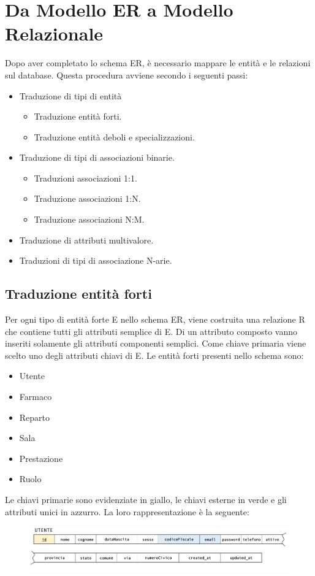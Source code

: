 \documentclass[paper=a4, fontsize=11pt,x11names]{report}
\begin{document}
\chapter{Da Modello ER a Modello Relazionale}
Dopo aver completato lo schema ER, è necessario mappare le entità e le relazioni sul database. Questa procedura avviene secondo i seguenti passi:

\begin{itemize}
\item Traduzione di tipi di entità
\begin{itemize}
\item Traduzione entità forti.
\item Traduzione entità deboli e specializzazioni.
\end{itemize}
\item Traduzione di tipi di associazioni binarie.
\begin{itemize}
\item Traduzioni associazioni 1:1.
\item Traduzione associazioni 1:N.
\item Traduzione associazioni N:M.
\end{itemize} 
\item Traduzione di attributi multivalore.
\item Traduzioni di tipi di associazione N-arie.
\end{itemize}

\section{Traduzione entità forti}
Per ogni tipo di entità forte E nello schema ER, viene costruita una relazione R che contiene tutti gli attributi semplice di E. Di un attributo composto vanno inseriti solamente gli attributi componenti semplici. Come chiave primaria viene scelto uno degli attributi chiavi di E.
Le entità forti presenti nello schema sono:
\begin{itemize}
\item Utente
\item Farmaco
\item Reparto
\item Sala
\item Prestazione
\item Ruolo
\end{itemize}
Le chiavi primarie sono evidenziate in giallo, le chiavi esterne in verde e gli attributi unici in azzurro. La loro rappresentazione è la seguente:
\begin{figure}[H]
\begin{center}
\includegraphics[scale=0.3]{utenteSchema}
\end{center}
\end{figure}
\end{document}
